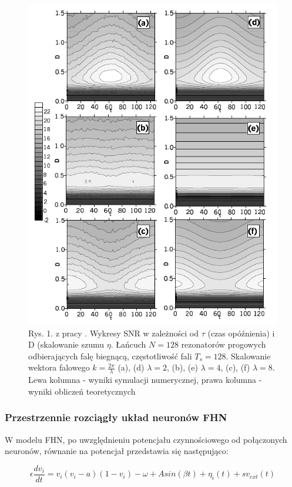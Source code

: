   \begin{figure}
    \includegraphics[width=120mm]{images/krawiecki_jezo_1.png}
    \caption{Rys. 1. z pracy \cite{ijmpb_23_2}. Wykresy SNR w zależności od $\tau$ (czas opóźnienia) i D (skalowanie szumu $\eta$. Łańcuch $N=128$ rezonatorów progowych odbierających falę biegnącą, częstotliwość fali $T_s = 128$. Skalowanie wektora falowego $k=\frac{2\pi}{\lambda}$ (a), (d) $\lambda = 2$, (b), (e) $\lambda = 4$, (c), (f) $\lambda = 8$. Lewa kolumna - wyniki symulacji numerycznej, prawa kolumna - wyniki obliczeń teoretycznych}
    \label{fig:graphics:krawiecki_jezo}
  \end{figure}

  \subsubsection{Przestrzennie rozciągły układ neuronów FHN}
  \label{sec:przestrzennie_rozciagly_fhn}

  W modelu FHN, po uwzględnieniu potencjału czynnościowego od połączonych neuronów, równanie na potencjał przedstawia się następująco:

  \begin{equation} \label{eq:v2}
    \epsilon \frac{dv_i}{dt} = v_i(v_i-a)(1-v_i)- \omega + A sin(\beta t) + \eta_i(t) + sv_{ext}(t)
  \end{equation}

